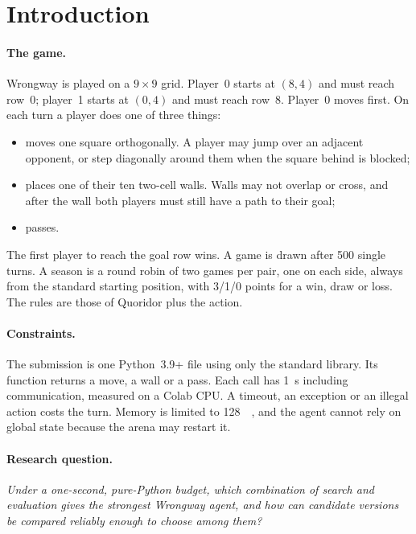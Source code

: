 \section{Introduction}
\label{sec:intro}

\paragraph{The game.}
Wrongway is played on a $9\times9$ grid. Player~0 starts at $(8,4)$ and must reach row~0;
player~1 starts at $(0,4)$ and must reach row~8. Player~0 moves first.
On each turn a player does one of three things:
\begin{itemize}
  \item moves one square orthogonally. A player may jump over an adjacent opponent, or step
        diagonally around them when the square behind is blocked;
  \item places one of their ten two-cell walls. Walls may not overlap or cross, and after the
        wall both players must still have a path to their goal;
  \item passes.
\end{itemize}
The first player to reach the goal row wins. A game is drawn after 500 single turns.
A season is a round robin of two games per pair, one on each side, always from the standard
starting position, with 3/1/0 points for a win, draw or loss.
The rules are those of Quoridor plus the  action.

\paragraph{Constraints.}
The submission is one Python~3.9+ file using only the standard library. Its function
 returns a move, a wall or a pass. Each call has \SI{1}{\second}
including communication, measured on a Colab CPU. A timeout, an exception or an illegal action
costs the turn. Memory is limited to \SI{128}{\mega\byte}, and the agent cannot rely on global
state because the arena may restart it.

\paragraph{Research question.}
\emph{Under a one-second, pure-Python budget, which combination of search and evaluation gives
the strongest Wrongway agent, and how can candidate versions be compared reliably enough to
choose among them?}

